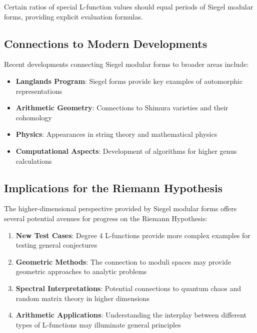 \begin{conjecture}
Certain ratios of special L-function values should equal periods of Siegel modular forms, providing explicit evaluation formulas.
\end{conjecture}

\subsection{Connections to Modern Developments}

Recent developments connecting Siegel modular forms to broader areas include:

\begin{itemize}
\item \textbf{Langlands Program}: Siegel forms provide key examples of automorphic representations
\item \textbf{Arithmetic Geometry}: Connections to Shimura varieties and their cohomology
\item \textbf{Physics}: Appearances in string theory and mathematical physics
\item \textbf{Computational Aspects}: Development of algorithms for higher genus calculations
\end{itemize}

\subsection{Implications for the Riemann Hypothesis}

The higher-dimensional perspective provided by Siegel modular forms offers several potential avenues for progress on the Riemann Hypothesis:

\begin{enumerate}
\item \textbf{New Test Cases}: Degree 4 L-functions provide more complex examples for testing general conjectures
\item \textbf{Geometric Methods}: The connection to moduli spaces may provide geometric approaches to analytic problems
\item \textbf{Spectral Interpretations}: Potential connections to quantum chaos and random matrix theory in higher dimensions
\item \textbf{Arithmetic Applications}: Understanding the interplay between different types of L-functions may illuminate general principles
\end{enumerate}

